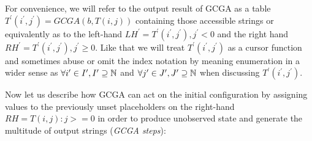 For convenience, we will refer to the output result of GCGA as a table $T^\prime(i^\prime,j^\prime) = GCGA(b, T(i,j))$ containing those accessible strings or equivalently as to the left-hand $LH^\prime = T^\prime(i^\prime,j^\prime), j^\prime < 0$ and the right hand $RH^\prime = T^\prime(i^\prime,j^\prime), j^\prime \geq 0$. Like that we will treat $T^\prime(i^\prime,j^\prime)$ as a cursor function and sometimes abuse or omit the index notation by meaning enumeration in a wider sense as $\forall i^\prime \in I^\prime, I^\prime \supseteq \mathbb{N}$ and $\forall j^\prime \in J^\prime, J^\prime \supseteq \mathbb{N}$ when discussing $T^\prime(i^\prime,j^\prime)$.

Now let us describe how GCGA can act on the initial configuration by assigning values to the previously unset placeholders on the right-hand $RH = {T(i,j): j >= 0}$ in order to produce unobserved state and generate the multitude of output strings (\textit{GCGA steps}):

